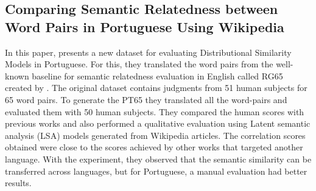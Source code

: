 \subsection{Comparing Semantic Relatedness between Word Pairs in Portuguese Using Wikipedia}

In this paper,  presents a new dataset for evaluating Distributional Similarity Models in Portuguese. For this, they translated the word pairs from the well-known baseline for semantic relatedness evaluation in English called RG65 created by . The original dataset contains judgments from 51 human subjects for 65 word pairs. To generate the PT65 they translated all the word-pairs and evaluated them with 50 human subjects. They compared the human scores with previous works and also performed a qualitative evaluation using Latent semantic analysis (LSA) models generated from Wikipedia articles. The correlation scores obtained were close to the scores achieved by other works that targeted another language. With the experiment, they observed that the semantic similarity can be transferred across languages, but for Portuguese, a manual evaluation had better results. 



 

